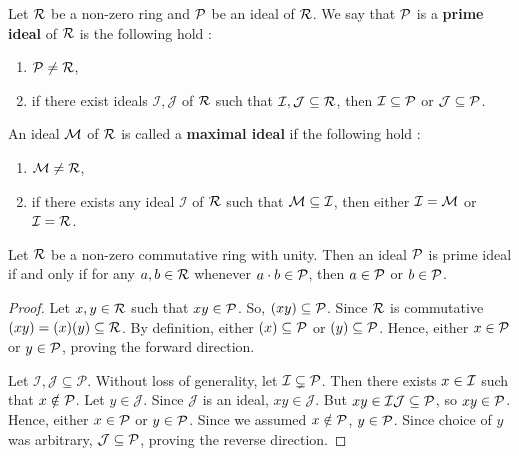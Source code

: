 \begin{definition}
  Let $\mathcal{R}$ be a non-zero ring and $\mathcal{P}$ be an ideal of $\mathcal{R}$. We say that $\mathcal{P}$ is a \textbf{prime ideal} of $\mathcal{R}$ is the following hold :
  \begin{enumerate}
    \item $\mathcal{P} \neq \mathcal{R}$,
    \item if there exist ideals $\mathcal{I},\mathcal{J}$ of $\mathcal{R}$ such that $\mathcal{I},\mathcal{J}\subseteq \mathcal{R}$, then $\mathcal{I}\subseteq \mathcal{P}$ or $\mathcal{J}\subseteq \mathcal{P}$.
  \end{enumerate}

      An ideal $\mathcal{M}$ of $\mathcal{R}$ is called a \textbf{maximal ideal} if the following hold :
      \begin{enumerate}
        \item $\mathcal{M} \neq \mathcal{R}$,
        \item if there exists any ideal $\mathcal{I}$ of $\mathcal{R}$ such that $\mathcal{M}\subseteq \mathcal{I}$, then either $\mathcal{I}=\mathcal{M}$ or $\mathcal{I}=\mathcal{R}$.
      \end{enumerate}
\end{definition}

\begin{prop}
  Let $\mathcal{R}$ be a non-zero commutative ring with unity. Then an ideal $\mathcal{P}$ is prime ideal if and only if for any $a,b\in \mathcal{R}$ whenever $a\cdot b\in \mathcal{P}$, then $a\in \mathcal{P}$ or $b\in \mathcal{P}$.
\end{prop}

\begin{proof}
  Let $x,y\in \mathcal{R}$ such that $xy \in \mathcal{P}$. So, $(xy)\subseteq \mathcal{P}$. Since $\mathcal{R}$ is commutative $(xy)=(x)(y)\subseteq \mathcal{R}$. By definition, either $(x)\subseteq \mathcal{P}$ or $(y)\subseteq \mathcal{P}$. Hence, either $x\in \mathcal{P}$ or $y\in \mathcal{P}$, proving the forward direction.

  Let $\mathcal{I},\mathcal{J}\subseteq \mathcal{P}$. Without loss of generality, let $\mathcal{I}\subsetneq \mathcal{P}$. Then there exists $x\in \cal{I}$ such that $x\notin \mathcal{P}$. Let $y\in \mathcal{J}$. Since $\mathcal{J}$ is an ideal, $xy\in \mathcal{J}$. But $xy \in \mathcal{I}\mathcal{J}\subseteq \mathcal{P}$,
  so $xy\in \mathcal{P}$. Hence, either $x\in \mathcal{P}$ or $y\in \mathcal{P}$. Since we assumed $x\notin \mathcal{P}$, $y\in \mathcal{P}$. Since choice of $y$ was arbitrary, $\mathcal{J}\subseteq \mathcal{P}$, proving the reverse direction.
\end{proof}

